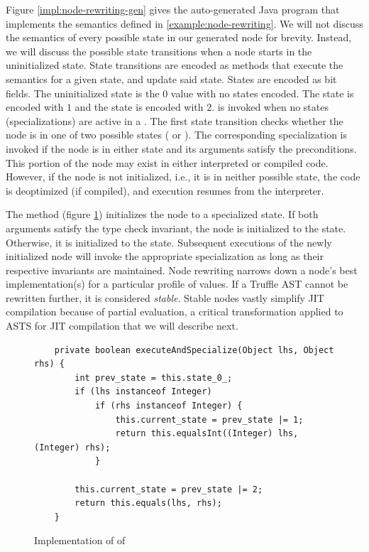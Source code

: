 Figure \ref{impl:node-rewriting-gen} gives the auto-generated Java program that implements the semantics defined in \ref{example:node-rewriting}.
We will not discuss the semantics of every possible state in our generated node for brevity.
Instead, we will discuss the possible state transitions when a node starts in the uninitialized state.
State transitions are encoded as methods that execute the semantics for a given state, and update said state.
States are encoded as bit fields.
The uninitialized state is the $0$ value with no states encoded.
The  state is encoded with $1$ and the  state is encoded with $2$.
 is invoked when no states (specializations) are active in a .
The first state transition checks whether the node is in one of two possible states ( or ).
The corresponding specialization is invoked if the node is in either state and its arguments satisfy the preconditions.
This portion of the node may exist in either interpreted or compiled code.
However, if the node is not initialized, i.e., it is in neither possible state, the code is deoptimized (if compiled), and execution resumes from the interpreter.

The  method (figure \ref{impl:node-rewriting-specialize}) initializes the node to a specialized state.
If both arguments satisfy the  type check invariant, the node is initialized to the  state.
Otherwise, it is initialized to the  state.
Subsequent executions of the newly initialized node will invoke the appropriate specialization as long as their respective invariants are maintained.
Node rewriting narrows down a node's best implementation(s) for a particular profile of values.
If a Truffle AST cannot be rewritten further, it is considered \textit{stable}.
Stable nodes vastly simplify JIT compilation because of partial evaluation, a critical transformation applied to ASTS for JIT compilation that we will describe next.

\begin{figure}[!htb]
	\begin{verbatim}
	private boolean executeAndSpecialize(Object lhs, Object rhs) {
		int prev_state = this.state_0_;
		if (lhs instanceof Integer) 
			if (rhs instanceof Integer) {
				this.current_state = prev_state |= 1;
				return this.equalsInt((Integer) lhs, (Integer) rhs);
			}
	
		this.current_state = prev_state |= 2;
		return this.equals(lhs, rhs);
	}
	\end{verbatim}
	\caption{Implementation of  of }
	\label{impl:node-rewriting-specialize}
\end{figure}


